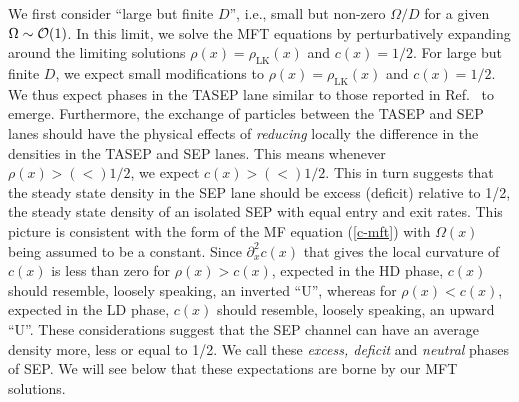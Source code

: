 \documentclass[aps,pre,twocolumn,superscriptaddress,amsmath,amssymb,longbibliography,floatfix]{revtex4}
\begin{document}
{We first consider ``large but finite $D$'', i.e., small but non-zero $\Omega/D$ for a given $\Omega\sim {\cal O}(1)$. In this limit, we solve the MFT equations by perturbatively expanding around the limiting solutions $\rho(x)=\rho_\text{LK}(x)$ and $c(x)=1/2$. For large but finite $D$, we expect small modifications to $\rho(x)=\rho_\text{LK}(x)$ and $c(x)=1/2$. We thus expect phases in the TASEP lane similar to those reported in Ref.~\cite{frey-lktasep} to emerge.  Furthermore, the exchange of particles between the TASEP and SEP lanes should have the physical effects of {\em reducing} locally the difference in the densities in the TASEP and SEP lanes. This means  whenever $\rho(x)>(<) 1/2$, we expect $c(x)>(<)1/2$. This in turn suggests that the steady state density in the SEP lane should be excess (deficit) relative to 1/2, the steady state density of an isolated SEP with equal entry and exit rates. This picture is consistent with the form of the MF equation (\ref{c-mft}) with $\Omega(x)$ being assumed to be a constant. Since $\partial_x^2 c(x)$ that gives the local curvature of $c(x)$ is less than zero for $\rho(x)>c(x)$, expected in the HD phase, $c(x)$ should resemble, loosely speaking, an inverted ``U'', whereas for $\rho(x)<c(x)$, expected in the LD phase,   $c(x)$ should resemble, loosely speaking, an upward ``U''. These considerations suggest that the SEP channel can have an average density more, less or equal to 1/2. We call these {\em excess, deficit} and {\em neutral} phases of SEP. We will see below that these expectations are borne by our MFT solutions.


}
\end{document}
